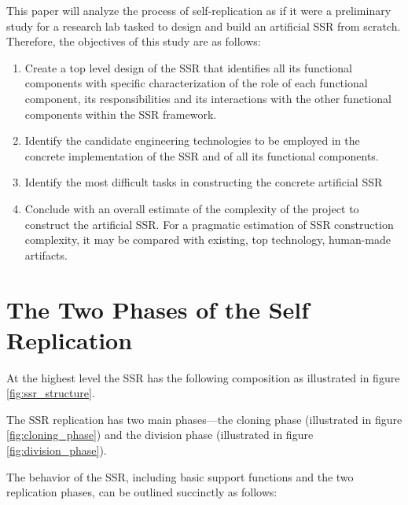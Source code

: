 This paper will analyze the process of self-replication as if it were 
a preliminary study for a research lab tasked to design and build an
artificial SSR from scratch.  Therefore, the objectives of this study 
are as follows:

\begin{enumerate}
\item  Create a top level design of the SSR that identifies all its
functional components with specific characterization of the role of
each functional component, its responsibilities and its interactions
with the other functional components within the SSR framework.
\item  Identify the candidate engineering technologies to be employed in
the concrete implementation of the SSR and of all its functional
components.
\item  Identify the most difficult tasks in constructing the
concrete artificial SSR
\item  Conclude with an overall estimate of the complexity of the
project to construct the artificial SSR. For a pragmatic estimation of
SSR construction complexity, it may be compared with 
existing, top technology, human-made artifacts.
\end{enumerate}

\section{The Two Phases of the Self Replication}

At the highest level the SSR has the following composition as
illustrated in figure \ref{fig:ssr_structure}.


The SSR replication has two main phases---the cloning phase (illustrated in figure \ref{fig:cloning_phase}) and the division phase (illustrated in figure \ref{fig:division_phase}).



The behavior of the SSR, including basic support functions and the two replication phases, can be outlined succinctly as follows:

